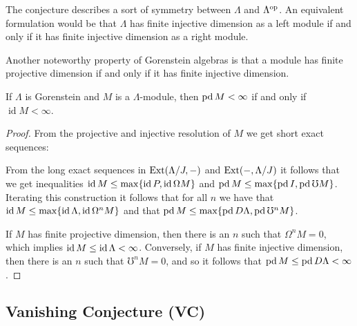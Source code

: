 The conjecture describes a sort of symmetry between $\Lambda$ and $\Lambda^{\operatorname{op}}$. An equivalent formulation would be that $\Lambda$ has finite injective dimension as a left module if and only if it has finite injective dimension as a right module.

Another noteworthy property of Gorenstein algebras is that a module has finite projective dimension if and only if it has finite injective dimension.

\begin{prop}\label{prop:Gorenstein_projdim_iff_injdim}
	If $\Lambda$ is Gorenstein and $M$ is a $\Lambda$-module, then $\operatorname{pd} M < \infty$ if and only if $\operatorname{id} M < \infty$.
	\begin{proof}
		From the projective and injective resolution of $M$ we get short exact sequences:
		\begin{center}
		\end{center}
		From the long exact sequences in $\operatorname{Ext}(\Lambda/J, -)$ and $\operatorname{Ext}(-, \Lambda/J)$ it follows that we get inequalities $\operatorname{id} M \leq \max\{\operatorname{id} P, \operatorname{id} \Omega M\}$ and $\operatorname{pd} M \leq \max\{\operatorname{pd} I, \operatorname{pd} \mho M\}$. Iterating this construction it follows that for all $n$ we have that $\operatorname{id} M \leq \max\{ \operatorname{id} \Lambda, \operatorname{id} \Omega^n M  \}$ and that $\operatorname{pd} M \leq \max\{\operatorname{pd} D\Lambda, \operatorname{pd}\mho^n M\}$.

		If $M$ has finite projective dimension, then there is an $n$ such that $\Omega^n M = 0$, which implies $\operatorname{id} M \leq \operatorname{id} \Lambda < \infty$. Conversely, if $M$ has finite injective dimension, then there is an $n$ such that $\mho^n M = 0$, and so it follows that $\operatorname{pd} M \leq \operatorname{pd} D\Lambda < \infty$.
	\end{proof}
\end{prop}


\subsection*{Vanishing Conjecture (VC)}

